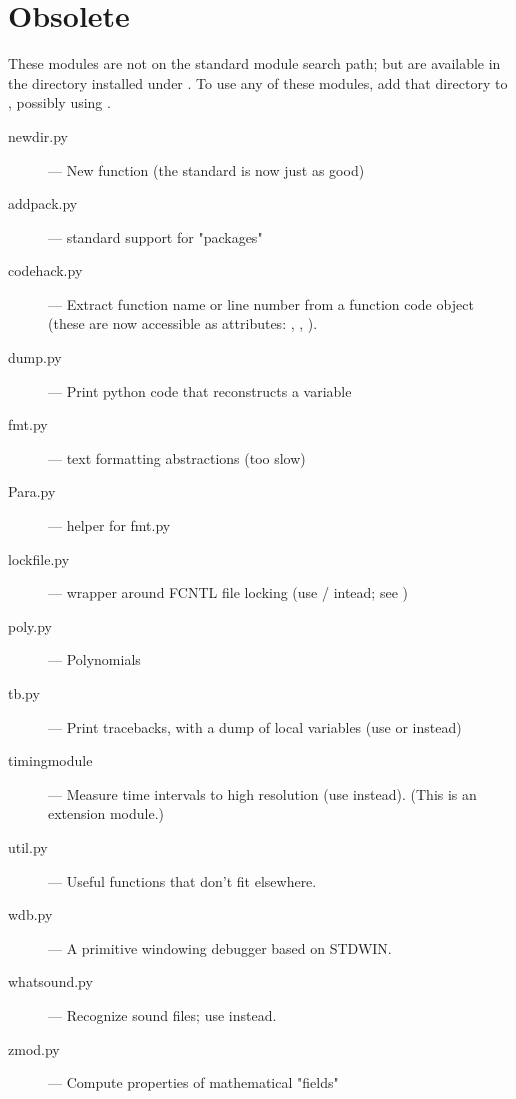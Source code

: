 \section{Obsolete}

These modules are not on the standard module search path;
but are available in the directory  installed  under
. %
To use any of these modules, add that directory to ,
possibly using .

\begin{description}
\item[newdir.py]
--- New  function (the standard  is
now just as good)

\item[addpack.py]
--- standard support for "packages"

\item[codehack.py]
--- Extract function name or line number from a function
code object (these are now accessible as attributes:
, ,
).

\item[dump.py]
--- Print python code that reconstructs a variable

\item[fmt.py]
--- text formatting abstractions (too slow)

\item[Para.py]
--- helper for fmt.py

\item[lockfile.py]
--- wrapper around FCNTL file locking (use
/ intead; see )

\item[poly.py]
--- Polynomials

\item[tb.py]
--- Print tracebacks, with a dump of local variables (use
 or  instead)

\item[timingmodule]
--- Measure time intervals to high resolution (use
 instead).  (This is an extension module.)

\item[util.py]
--- Useful functions that don't fit elsewhere.

\item[wdb.py]
--- A primitive windowing debugger based on STDWIN.

\item[whatsound.py]
--- Recognize sound files; use  instead.

\item[zmod.py]
--- Compute properties of mathematical "fields"
\end{description}

